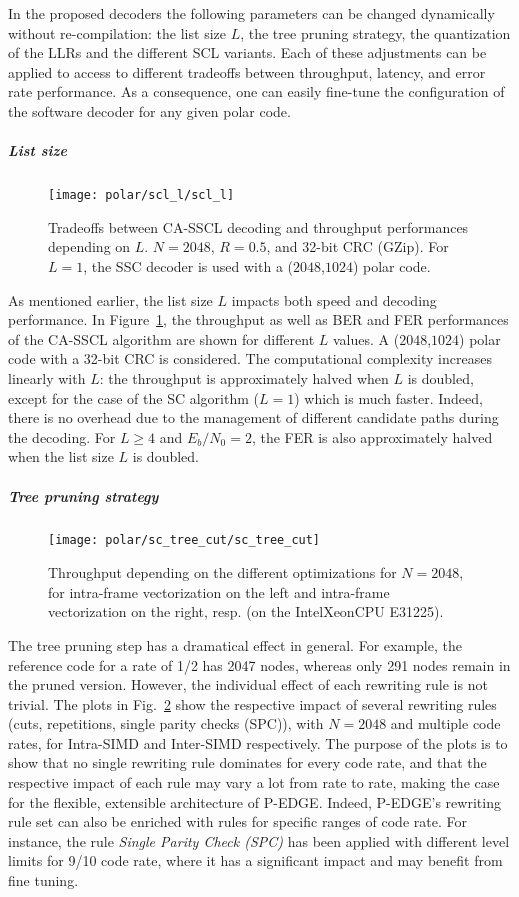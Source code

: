 In the proposed decoders the following parameters can be changed dynamically
without re-compilation: the list size $L$, the tree pruning strategy, the
quantization of the LLRs and the different SCL variants. Each of these
adjustments can be applied to access to different tradeoffs between throughput,
latency, and error rate performance. As a consequence, one can easily fine-tune
the configuration of the software decoder for any given polar code.

\subparagraph{List size}

\begin{figure}
  \centering
  \texttt{[image: polar/scl\_l/scl\_l]}
  \caption{Tradeoffs between CA-SSCL decoding and throughput performances
    depending on $L$. $N=2048$, $R=0.5$, and 32-bit CRC (GZip). For $L=1$, the
    SSC decoder is used with a ($2048$,$1024$) polar code.}
  \label{plot:polar_scl_l}
\end{figure}

As mentioned earlier, the list size $L$ impacts both speed and decoding
performance. In Figure~\ref{plot:polar_scl_l}, the throughput as well as BER and
FER performances of the CA-SSCL algorithm are shown for different $L$ values. A
($2048$,$1024$) polar code with a 32-bit CRC is considered. The computational
complexity increases linearly with $L$: the throughput is approximately halved
when $L$ is doubled, except for the case of the SC algorithm ($L=1$) which is
much faster. Indeed, there is no overhead due to the management of different
candidate paths during the decoding. For $L\geq4$ and $E_b/N_0=2$, the FER is
also approximately halved when the list size $L$ is doubled.

\subparagraph{Tree pruning strategy}

\begin{figure}[htp]
\texttt{[image: polar/sc\_tree\_cut/sc\_tree\_cut]}
\caption{Throughput depending on the different optimizations for $N = 2048$, for
  intra-frame vectorization on the left and intra-frame vectorization on the
  right, resp. (on the Intel\R Xeon\TM CPU E31225).}
\label{plot:polar_sc_tree_cut}
\end{figure}

The tree pruning step has a dramatical effect in general. For example, the
reference code for a rate of 1/2 has 2047 nodes, whereas only 291 nodes remain
in the pruned version. However, the individual effect of each rewriting rule is
not trivial. The plots in Fig.~\ref{plot:polar_sc_tree_cut} show the respective
impact of several rewriting rules (cuts, repetitions, single parity checks
(SPC)), with $N = 2048$ and multiple code rates, for Intra-SIMD and Inter-SIMD
respectively. The purpose of the plots is to show that no single rewriting rule
dominates for every code rate, and that the respective impact of each rule may
vary a lot from rate to rate, making the case for the flexible, extensible
architecture of P-EDGE. Indeed, P-EDGE's rewriting rule set can also be enriched
with rules for specific ranges of code rate. For instance, the rule
\emph{Single Parity Check (SPC)} has been applied with different level limits
for 9/10 code rate, where it has a significant impact and may benefit from fine
tuning.

